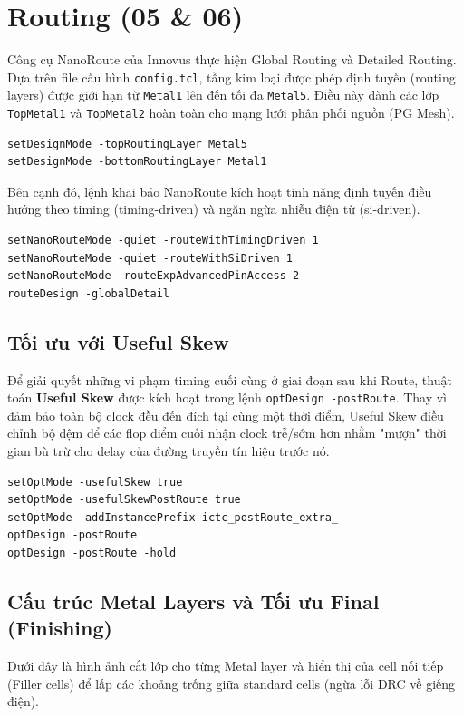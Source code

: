 \documentclass[12pt,a4paper]{article}
\begin{document}
\section{Routing (05 \& 06)}

Công cụ NanoRoute của Innovus thực hiện Global Routing và Detailed Routing. Dựa trên file cấu hình \texttt{config.tcl}, tầng kim loại được phép định tuyến (routing layers) được giới hạn từ \texttt{Metal1} lên đến tối đa \texttt{Metal5}. Điều này dành các lớp \texttt{TopMetal1} và \texttt{TopMetal2} hoàn toàn cho mạng lưới phân phối nguồn (PG Mesh).

\begin{lstlisting}[caption={Giới hạn lớp định tuyến}]
setDesignMode -topRoutingLayer Metal5
setDesignMode -bottomRoutingLayer Metal1
\end{lstlisting}

Bên cạnh đó, lệnh khai báo NanoRoute kích hoạt tính năng định tuyến điều hướng theo timing (timing-driven) và ngăn ngừa nhiễu điện từ (si-driven).

\begin{lstlisting}[caption={Cấu hình NanoRoute và tiến hành Routing (05\_route.tcl)}]
setNanoRouteMode -quiet -routeWithTimingDriven 1
setNanoRouteMode -quiet -routeWithSiDriven 1
setNanoRouteMode -routeExpAdvancedPinAccess 2
routeDesign -globalDetail
\end{lstlisting}

\subsection{Tối ưu với Useful Skew}
Để giải quyết những vi phạm timing cuối cùng ở giai đoạn sau khi Route, thuật toán \textbf{Useful Skew} được kích hoạt trong lệnh \texttt{optDesign -postRoute}. Thay vì đảm bảo toàn bộ clock đều đến đích tại cùng một thời điểm, Useful Skew điều chỉnh bộ đệm để các flop điểm cuối nhận clock trễ/sớm hơn nhằm "mượn" thời gian bù trừ cho delay của đường truyền tín hiệu trước nó.

\begin{lstlisting}[caption={Áp dụng Useful Skew trong Post-Route Optimization}]
setOptMode -usefulSkew true
setOptMode -usefulSkewPostRoute true
setOptMode -addInstancePrefix ictc_postRoute_extra_
optDesign -postRoute
optDesign -postRoute -hold
\end{lstlisting}

\subsection{Cấu trúc Metal Layers và Tối ưu Final (Finishing)}
Dưới đây là hình ảnh cắt lớp cho từng Metal layer và hiển thị của cell nối tiếp (Filler cells) để lấp các khoảng trống giữa standard cells (ngừa lỗi DRC về giếng điện).
\end{document}

